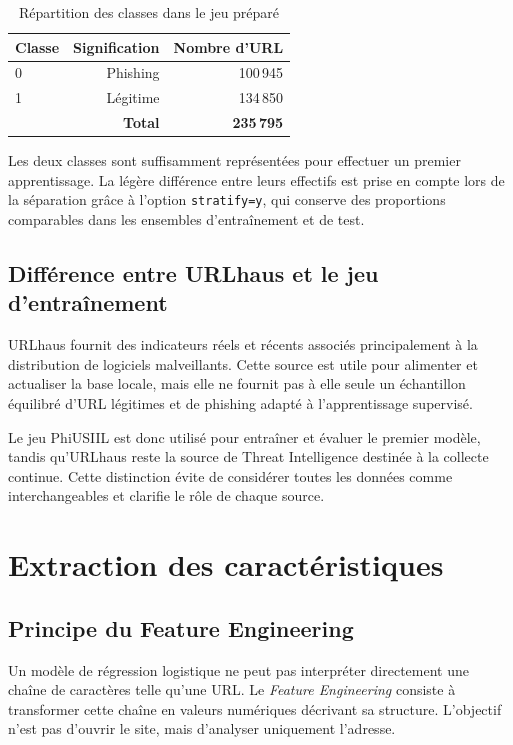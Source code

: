 \documentclass[11pt,a4paper]{report}
\begin{document}
\begin{table}[H]
\centering
\caption{Répartition des classes dans le jeu préparé}
\begin{tabular}{lrr}
\toprule
\textbf{Classe} & \textbf{Signification} & \textbf{Nombre d'URL}\\
\midrule
0 & Phishing & 100\,945\\
1 & Légitime & 134\,850\\
\midrule
\multicolumn{2}{r}{\textbf{Total}} & \textbf{235\,795}\\
\bottomrule
\end{tabular}
\end{table}

Les deux classes sont suffisamment représentées pour effectuer un premier
apprentissage. La légère différence entre leurs effectifs est prise en compte
lors de la séparation grâce à l'option \texttt{stratify=y}, qui conserve des
proportions comparables dans les ensembles d'entraînement et de test.

\section{Différence entre URLhaus et le jeu d'entraînement}

URLhaus fournit des indicateurs réels et récents associés principalement à la
distribution de logiciels malveillants. Cette source est utile pour alimenter
et actualiser la base locale, mais elle ne fournit pas à elle seule un
échantillon équilibré d'URL légitimes et de phishing adapté à l'apprentissage
supervisé.

Le jeu PhiUSIIL est donc utilisé pour entraîner et évaluer le premier modèle,
tandis qu'URLhaus reste la source de Threat Intelligence destinée à la
collecte continue. Cette distinction évite de considérer toutes les données
comme interchangeables et clarifie le rôle de chaque source.

\chapter{Extraction des caractéristiques}

\section{Principe du Feature Engineering}

Un modèle de régression logistique ne peut pas interpréter directement une
chaîne de caractères telle qu'une URL. Le \emph{Feature Engineering} consiste
à transformer cette chaîne en valeurs numériques décrivant sa structure.
L'objectif n'est pas d'ouvrir le site, mais d'analyser uniquement l'adresse.
\end{document}
